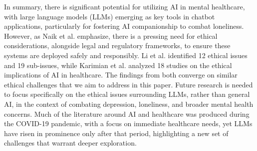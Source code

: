 In summary, there is significant potential for utilizing AI in mental healthcare, with large language models (LLMs) emerging as key tools in chatbot applications, particularly for fostering AI companionship to combat loneliness. However, as Naik et al. \cite{naik2022legal} emphasize, there is a pressing need for ethical considerations, alongside legal and regulatory frameworks, to ensure these systems are deployed safely and responsibly. Li et al. \cite{li2022ethics} identified 12 ethical issues and 19 sub-issues, while Karimian et al. \cite{karimian2022ethical} analyzed 18 studies on the ethical implications of AI in healthcare. The findings from both converge on similar ethical challenges that we aim to address in this paper. Future research is needed to focus specifically on the ethical issues surrounding LLMs, rather than general AI, in the context of combating depression, loneliness, and broader mental health concerns. Much of the literature around AI and healthcare was produced during the COVID-19 pandemic, with a focus on immediate healthcare needs, yet LLMs have risen in prominence only after that period, highlighting a new set of challenges that warrant deeper exploration.